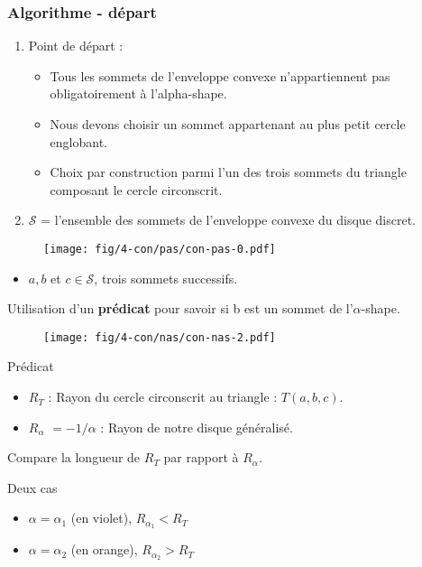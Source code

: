 \begin{frame}
\frametitle{Algorithme - départ}

{
  \begin{block}{}
    \begin{enumerate}
      \item Point de départ :
      \begin{itemize}
        \item Tous les sommets de l'enveloppe convexe n'appartiennent pas obligatoirement à l'alpha-shape.
        \item Nous devons choisir un sommet appartenant au plus petit cercle englobant.
        \item Choix par construction parmi l'un des trois sommets du triangle composant le cercle circonscrit.
      \end{itemize}

      \item  $\mathcal{S}$ = l'ensemble des sommets de l'enveloppe convexe du disque discret.
    \end{enumerate}
  \end{block}
}  
{
  \begin{figure}[H]
    \centering
    \texttt{[image: fig/4-con/pas/con-pas-0.pdf]}
  \end{figure}
}  

{
  \begin{block}{}
    \begin{itemize}
      \item $a,b$ et $c \in \mathcal{S}$, trois sommets successifs.
    \end{itemize} 
    Utilisation d'un \textbf{prédicat} pour savoir si b est un sommet de l'$\alpha$-shape.
  \end{block}
}

{
  \begin{figure}[H]
    \centering
    \texttt{[image: fig/4-con/nas/con-nas-2.pdf]}
  \end{figure}
}  

{
  \begin{block}{Prédicat}
    \begin{itemize}
      \item \textbf{$R_T$} : Rayon du cercle circonscrit au triangle : $T(a, b, c)$.
      \item \textbf{$R_{\alpha}$} $= -1/\alpha$ : Rayon de notre disque généralisé.
    \end{itemize}      
    Compare la longueur de \textbf{$R_T$} par rapport à \textbf{$R_{\alpha}$}.\\
  \end{block}
}
{
  \begin{alertblock}{Deux cas}
    \begin{itemize}
      \item $\alpha = \alpha_{1}$ (en violet), \textbf{$R_{\alpha_{1}} < R_T$}
      \item $\alpha = \alpha_{2}$ (en orange), \textbf{$R_{\alpha_{2}} > R_T$}
    \end{itemize}
  \end{alertblock}
}


\end{frame}
